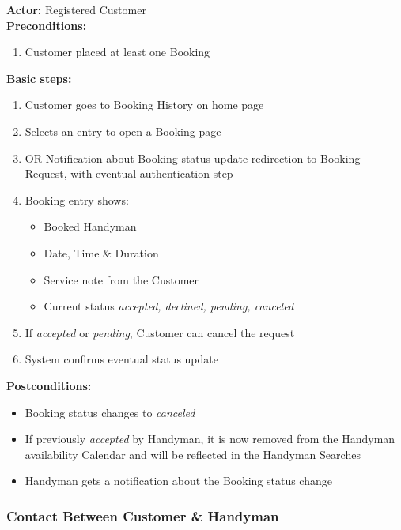 \documentclass[11pt,a4paper]{article}
\begin{document}
\textbf{Actor:} Registered Customer \\
\textbf{Preconditions:}
\begin{enumerate}
\item Customer placed at least one Booking
\end{enumerate}
\textbf{Basic steps:}
\begin{enumerate}
\item Customer goes to Booking History on home page
\item Selects an entry to open a Booking page
\item OR Notification about Booking status update redirection to Booking Request, with eventual authentication step
\item Booking entry shows:
  \begin{itemize}
  \item Booked Handyman
  \item Date, Time \& Duration
  \item Service note from the Customer
  \item Current status \textit{accepted, declined, pending, canceled}
  \end{itemize}
\item If \textit{accepted} or \textit{pending}, Customer can cancel the request
\item System confirms eventual status update
\end{enumerate}
\textbf{Postconditions:}
\begin{itemize}
\item Booking status changes to \textit{canceled}
\item If previously \textit{accepted} by Handyman, it is now removed from the Handyman availability Calendar and will be reflected in the Handyman Searches
\item Handyman gets a notification about the Booking status change
\end{itemize}


\subsubsection{Contact Between Customer \& Handyman}
\end{document}
